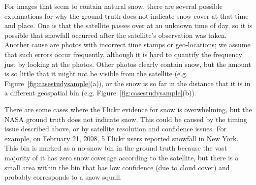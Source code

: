 
For images that seem to contain natural snow, there are several possible explanations for why the ground
truth does not indicate snow cover at that time and place. One is that the
satellite passes over at an unknown time of day, so it is possible that snowfall occurred 
after the satellite's observation was taken.
Another cause are photos with incorrect time stamps or geo-locations; we
assume that such errors occur frequently, although it is hard to quantify the
frequency just by looking at the photos.
Other photos clearly contain snow, but the amount is so little 
that it might not be visible from the satellite (e.g.
Figure~\ref{fig:casestudysample}(a)), or the snow is so far in the distance
that it is in a different geospatial bin (e.g. Figure~\ref{fig:casestudysample}(b)).


There are some cases where the Flickr evidence for snow is overwhelming, but the NASA ground truth does not indicate snow.
This could be caused by the timing issue described above, or by 
satellite resolution and confidence issues. For example, on February 21, 2008, 5 Flickr users reported snowfall in New York.
This bin is marked as a
no-snow bin in the ground truth because the vast majority of it has zero snow coverage according to the satellite, but there is a 
small area within the bin that has low confidence (due to cloud cover) and probably corresponds to a snow squall.


